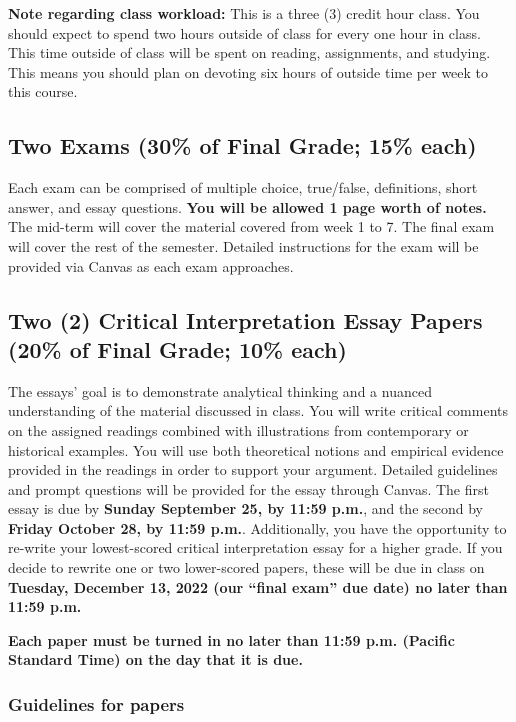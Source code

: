 \documentclass[11pt,]{article}
\begin{document}
\textbf{Note regarding class workload:} This is a three (3) credit hour
class. You should expect to spend two hours outside of class for every
one hour in class. This time outside of class will be spent on reading,
assignments, and studying. This means you should plan on devoting six
hours of outside time per week to this course.

\hypertarget{two-exams-30-of-final-grade-15-each}{%
\subsection{Two Exams (30\% of Final Grade; 15\%
each)}\label{two-exams-30-of-final-grade-15-each}}

Each exam can be comprised of multiple choice, true/false, definitions,
short answer, and essay questions. \textbf{You will be allowed 1 page
worth of notes.} The mid-term will cover the material covered from week
1 to 7. The final exam will cover the rest of the semester. Detailed
instructions for the exam will be provided via Canvas as each exam
approaches.

\hypertarget{writing_assignments}{%
\subsection{Two (2) Critical Interpretation Essay Papers (20\% of Final
Grade; 10\% each)}\label{writing_assignments}}

The essays' goal is to demonstrate analytical thinking and a nuanced
understanding of the material discussed in class. You will write
critical comments on the assigned readings combined with illustrations
from contemporary or historical examples. You will use both theoretical
notions and empirical evidence provided in the readings in order to
support your argument. Detailed guidelines and prompt questions will be
provided for the essay through Canvas. The first essay is due by
\textbf{Sunday September 25, by 11:59 p.m.}, and the second by
\textbf{Friday October 28, by 11:59 p.m.}. Additionally, you have the
opportunity to re-write your lowest-scored critical interpretation essay
for a higher grade. If you decide to rewrite one or two lower-scored
papers, these will be due in class on \textbf{Tuesday, December 13, 2022
(our ``final exam'' due date) no later than 11:59 p.m.}

\textbf{Each paper must be turned in no later than 11:59 p.m. (Pacific
Standard Time) on the day that it is due.}

\hypertarget{guidelines-for-papers}{%
\subsubsection{Guidelines for papers}\label{guidelines-for-papers}}
\end{document}
